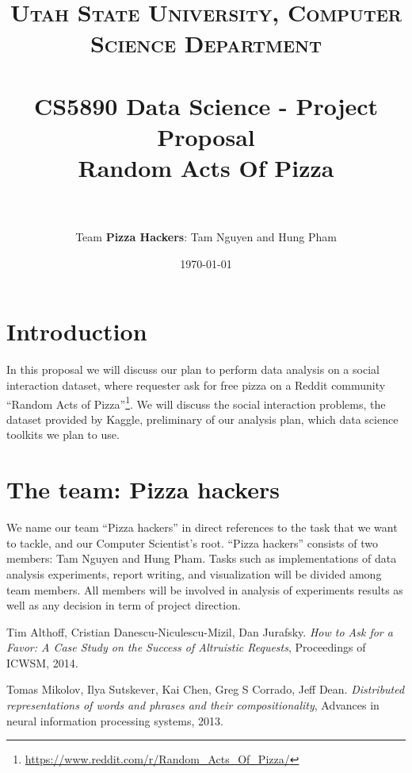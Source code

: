 \documentclass[paper=a4, fontsize=11pt]{scrartcl} %
\title{	
\normalfont \normalsize 
\textsc{Utah State University, Computer Science Department} \\ [25pt] %
\horrule{0.5pt} \\[0.4cm] %
\huge CS5890 Data Science - Project Proposal \\ Random Acts Of Pizza \\ %
\horrule{2pt} \\[0.5cm] %
}
\author{Team \textbf{Pizza Hackers}: Tam Nguyen and Hung Pham} %
\date{\normalsize\today} %
\newcommand{\q}[1]{``#1''}
\begin{document}
	
\maketitle
	
\section{Introduction}

In this proposal we will discuss our plan to perform data analysis on a social interaction dataset, where requester ask for free pizza on a Reddit community \q{Random Acts of Pizza}\footnote{\url{https://www.reddit.com/r/Random_Acts_Of_Pizza/}}. We will discuss the social interaction problems, the dataset provided by Kaggle, preliminary of our analysis plan, which data science toolkits we plan to use.

\section{The team: Pizza hackers}

We name our team \q{Pizza hackers} in direct references to the task that we want to tackle, and our Computer Scientist's root. \q{Pizza hackers} consists of two members: Tam Nguyen and Hung Pham. Tasks such as implementations of data analysis experiments, report writing, and visualization will be divided among team members. All members will be involved in analysis of experiments results as well as any decision in term of project direction.









\begin{thebibliography}{10}

Tim Althoff, Cristian Danescu-Niculescu-Mizil, Dan Jurafsky.
\emph{How to Ask for a Favor: A Case Study on the Success of Altruistic Requests},
Proceedings of ICWSM,
2014.

Tomas Mikolov, Ilya Sutskever, Kai Chen, Greg S Corrado, Jeff Dean.
\emph{Distributed representations of words and phrases and their compositionality},
Advances in neural information processing systems,
2013.


\end{thebibliography}
\end{document}
